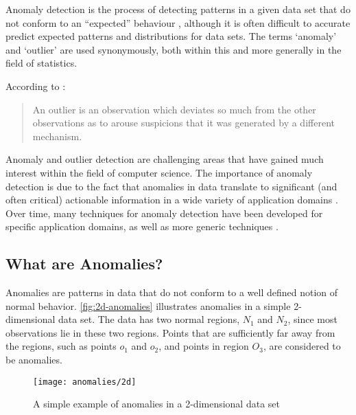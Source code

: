 Anomaly detection is the process of detecting patterns in a given data set that
do not conform to an ``expected'' behaviour \cite{Chandola:2007}, although it is
often difficult to accurate predict expected patterns and distributions for data
sets. The terms `anomaly' and `outlier' are used synonymously, both within this
\thesis{} and more generally in the field of statistics.

According to \citeauthor{Hawkins:1980} \cite{Hawkins:1980}:
\begin{quote}
An outlier is an observation which deviates so much from the other observations
as to arouse suspicions that it was generated by a different mechanism.
\end{quote}

Anomaly and outlier detection are challenging areas that have gained much
interest within the field of computer science. The importance of anomaly
detection is due to the fact that anomalies in data translate to significant
(and often critical) actionable information in a wide variety of application
domains \cite{Chandola:2007}. Over time, many techniques for anomaly detection
have been developed for specific application domains, as well as more generic
techniques \cite{Chandola:2007}.

\subsection{What are Anomalies?}
\label{anomalyDetection:whatAre}
Anomalies are patterns in data that do not conform to a well defined notion of
normal behavior. \autoref{fig:2d-anomalies} illustrates anomalies in a simple
2-dimensional data set. The data has two normal regions, $N_1$ and $N_2$, since
most observations lie in these two regions. Points that are sufficiently far
away from the regions, such as points $o_1$ and $o_2$, and points in region
$O_3$, are considered to be anomalies.

\begin{figure}
    \centering
    \texttt{[image: anomalies/2d]}
    \caption[A simple example of anomalies in a 2-dimensional data set]{A
        simple example of anomalies in a 2-dimensional data set
        \cite{Chandola:2007}}
    \label{fig:2d-anomalies}
\end{figure}


